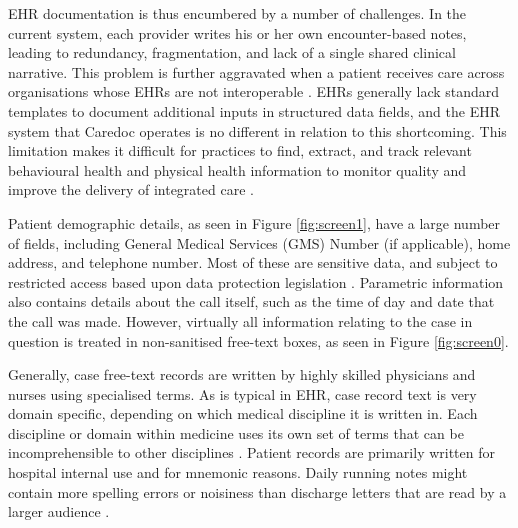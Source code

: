 EHR documentation is thus encumbered by a number of challenges. In the current system, each provider writes his or her own encounter-based notes, leading to redundancy, fragmentation, and lack of a single shared clinical narrative. This problem is further aggravated when a patient receives care across organisations whose EHRs are not interoperable \cite{warner2019s}. EHRs generally lack standard templates to document additional inputs in structured data fields, and the EHR system that Caredoc operates is no different in relation to this shortcoming. This limitation makes it difficult for practices to find, extract, and track relevant behavioural health and physical health information to monitor quality and improve the delivery of integrated care \cite{cifuentes2015electronic}.

Patient demographic details, as seen in Figure \ref{fig:screen1}, have a large number of fields, including General Medical Services (GMS) Number (if applicable), home address, and telephone number. Most of these are sensitive data, and subject to restricted access based upon data protection legislation \cite{dataprotection2018}. Parametric information also contains details about the call itself, such as the time of day and date that the call was made. However, virtually all information relating to the case in question is treated in non-sanitised free-text boxes, as seen in Figure \ref{fig:screen0}.

Generally, case free-text records are written by highly skilled physicians and nurses using specialised terms. As is typical in EHR, case record text is very domain specific, depending on which medical discipline it is written in. Each discipline or domain within medicine uses its own set of terms that can be incomprehensible to other disciplines \cite{dalianis2018characteristics}. Patient records are primarily written for hospital internal use and for mnemonic reasons. Daily running notes might contain more spelling errors or noisiness than discharge letters that are read by a larger audience \cite{ehrentraut2012detection}. 


